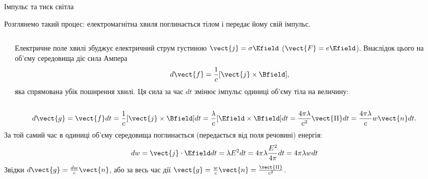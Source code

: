 \documentclass[onlytextwidth]{beamer}
\begin{document}
\begin{frame}{Імпульс та тиск світла}{}
\begin{block}{}
    Розглянемо такий процес: електромагнітна хвиля поглинається тілом і передає йому свій імпульс.
\end{block}
	\begin{columns}
		\begin{column}{0.4\linewidth}\centering
			
		\end{column}
		\begin{column}{0.6\linewidth}
			\begin{block}{}\justifying\small
				Електричне поле хвилі збуджує електричний струм густиною $ \vect{j} = \sigma\Efield $ ($ \vect{F} = e\Efield $). Внаслідок цього на
				об'єму середовища діє сила Ампера
                \begin{equation*}
                    d\vect{f} = \frac1c[\vect{j}\times\Bfield],
                \end{equation*}
        яка спрямована убік поширення хвилі. Ця сила за час $dt$ змінює імпульс одиниці об'єму тіла на величину:

			\end{block}
		\end{column}
	\end{columns}
\begin{block}{}\justifying
\begin{equation*}
    d\vect{g} = \vect{f} dt =  \frac1c[\vect{j}\times\Bfield] dt = \frac{\lambda}{c}[\Efield \times\Bfield]dt = \frac{4\pi\lambda}{c^2}\vect{\Pi}dt
    =
    \frac{4\pi\lambda}{c} w \vect{n} dt.
\end{equation*}
    За той самий час в одиниці об'єму середовища поглинається (передається від поля речовині) енергія:
\begin{equation*}
    dw = \vect{j}\cdot\Efield dt = \lambda E^2dt = 4\pi\lambda \frac{E^2}{4\pi} dt = 4\pi\lambda w dt
\end{equation*}
Звідки $d\vect{g} = \frac{dw}c \vect{n}$, або за весь час дії $\vect{g} = \frac{w}{c} \vect{n} = \frac{\vect{\Pi}}{c^2}$.
\end{block}
\end{frame}
\end{document}

